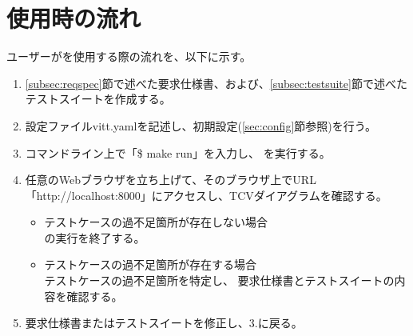 \section{\tool{}使用時の流れ}\label{sec:flow_using_tool}

ユーザーが\tool{}を使用する際の流れを、以下に示す。

\begin{enumerate}
    \item \ref{subsec:reqspec}節で述べた要求仕様書、および、\ref{subsec:testsuite}節で述べたテストスイートを作成する。
    \item 設定ファイルvitt.yamlを記述し、初期設定(\ref{sec:config}節参照)を行う。
    \item コマンドライン上で「\$ make run」を入力し、\tool{} を実行する。
    \item 任意のWebブラウザを立ち上げて、そのブラウザ上でURL「http://localhost:8000」にアクセスし、TCVダイアグラムを確認する。
    \begin{itemize}
        \item テストケースの過不足箇所が存在しない場合\\
        \tool{}の実行を終了する。
        \item テストケースの過不足箇所が存在する場合\\
        テストケースの過不足箇所を特定し、
        要求仕様書とテストスイートの内容を確認する。
    \end{itemize}
    \item 要求仕様書またはテストスイートを修正し、3.に戻る。
\end{enumerate}